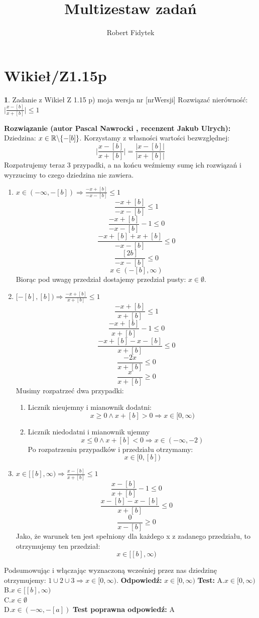 \documentclass[12pt, a4paper]{article}
\title{Multizestaw zadań}
\author{Robert Fidytek}
\date{}
\theoremstyle{definition} %
\newtheorem{zad}{}
\newcommand{\kategoria}[1]{\section{#1}} %
\newcommand{\zadStart}[1]{\begin{zad}#1\newline} %
\newcommand{\zadStop}{\end{zad}}   %
\newcommand{\rozwStart}[2]{\noindent \textbf{Rozwiązanie (autor #1 , recenzent #2): }\newline} %
\newcommand{\rozwStop}{\newline}                                            %
\newcommand{\odpStart}{\noindent \textbf{Odpowiedź:}\newline}    %
\newcommand{\odpStop}{\newline}                                             %
\newcommand{\testStart}{\noindent \textbf{Test:}\newline} %
\newcommand{\testStop}{\newline} %
\newcommand{\kluczStart}{\noindent \textbf{Test poprawna odpowiedź:}\newline} %
\newcommand{\kluczStop}{\newline} %
\begin{document}
\maketitle


\kategoria{Wikieł/Z1.15p}
\zadStart{Zadanie z Wikieł Z 1.15 p) moja wersja nr [nrWersji]}
Rozwiązać nierówność: $\big|\frac{x-[b]}{x+[b]}\big|\leq1$
\zadStop
\rozwStart{Pascal Nawrocki}{Jakub Ulrych}
Dziedzina: $x\in\mathbb{R}\symbol{92}\{-[b]\}$.
Korzystamy z własności wartości bezwzględnej:
$$\bigg|\frac{x-[b]}{x+[b]}\bigg|=\frac{|x-[b]|}{|x+[b]|}$$
Rozpatrujemy teraz 3 przypadki, a na końcu weźmiemy sumę ich rozwiązań i wyrzucimy to czego dziedzina nie zawiera.
\begin{enumerate}
\item $x\in(-\infty,-[b])\Rightarrow\frac{-x+[b]}{-x-[b]}\leq1$
$$\frac{-x+[b]}{-x-[b]}\leq1$$
$$\frac{-x+[b]}{-x-[b]}-1\leq0$$
$$\frac{-x+[b]+x+[b]}{-x-[b]}\leq0$$
$$\frac{[2b]}{-x-[b]}\leq0$$
$$x\in(-[b],\infty)$$
Biorąc pod uwagę przedział dostajemy przedział pusty: $x\in\emptyset$.
\item $ [-[b],[b])\Rightarrow\frac{-x+[b]}{x+[b]}\leq1$
$$\frac{-x+[b]}{x+[b]}\leq1$$
$$\frac{-x+[b]}{x+[b]}-1\leq0$$
$$\frac{-x+[b]-x-[b]}{x+[b]}\leq0$$
$$\frac{-2x}{x+[b]}\leq0$$
$$\frac{x}{x+[b]}\geq0$$
Musimy rozpatrzeć dwa przypadki:
\begin {enumerate}
\item
Licznik nieujemny i mianownik dodatni:
$$x\geq0 \wedge x+[b]>0\Rightarrow x\in[0,\infty)$$
\item
Licznik niedodatni i mianownik ujemny
$$x\leq0 \wedge x+[b]<0\Rightarrow x\in(-\infty,-2)$$
Po rozpatrzeniu przypadków i przedziału otrzymamy:
$$x\in[0,[b])$$
\end{enumerate}
\item $x\in[[b],\infty)\Rightarrow\frac{x-[b]}{x+[b]}\leq1$
$$\frac{x-[b]}{x+[b]}-1\leq0$$
$$\frac{x-[b]-x-[b]}{x+[b]}\leq0$$
$$\frac{0}{x-[b]}\geq0$$
Jako, że warunek ten jest spełniony dla każdego x z zadanego przedziału, to otrzymujemy ten przedział:
$$x\in[[b],\infty)$$
\end{enumerate}
Podsumowując i włączając wyznaczoną wcześniej przez nas dziedzinę otrzymujemy: $1\cup2\cup3\Rightarrow x\in[0,\infty)$.
\rozwStop
\odpStart
$x\in[0,\infty)$
\odpStop
\testStart
A.$x\in[0,\infty)$
\\
B.$x\in[[b],\infty)$
\\
C.$x\in\emptyset$
\\
D.$x\in(-\infty,-[a])$
\testStop
\kluczStart
A
\kluczStop
\end{document}
